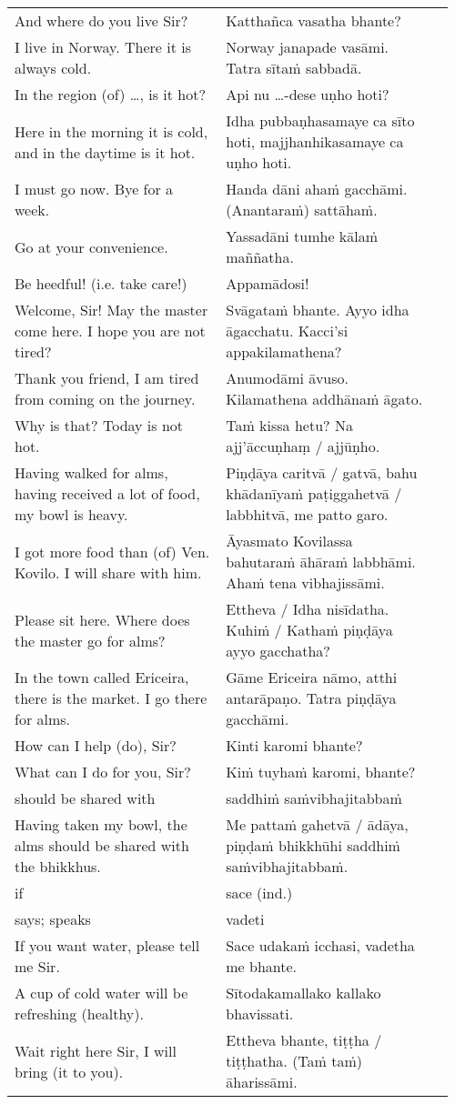 \documentclass[a5paper]{memoir}
\begin{document}
\begin{longtable}{L{0.48\linewidth} L{0.48\linewidth} H}
And where do you live Sir? & Katthañca vasatha bhante? & \\[0pt]
I live in Norway. There it is always cold. & Norway janapade vasāmi. Tatra sītaṁ sabbadā. & \\[0pt]
In the region (of) \ldots{}, is it hot? & Api nu \ldots{}-dese uṇho hoti? & \\[0pt]
Here in the morning it is cold, and in the daytime is it hot. & Idha pubbaṇhasamaye ca sīto hoti, majjhanhikasamaye ca uṇho hoti. & \\[0pt]
I must go now. Bye for a week. & Handa dāni ahaṁ gacchāmi. (Anantaraṁ) sattāhaṁ. & \\[0pt]
Go at your convenience. & Yassadāni tumhe kālaṁ maññatha. & \\[0pt]
Be heedful! (i.e. take care!) & Appamādosi! & \\[0pt]
Welcome, Sir! May the master come here. I hope you are not tired? & Svāgataṁ bhante. Ayyo idha āgacchatu. Kacci'si appakilamathena? & \\[0pt]
Thank you friend, I am tired from coming on the journey. & Anumodāmi āvuso. Kilamathena addhānaṁ āgato. & \\[0pt]
Why is that? Today is not hot. & Taṁ kissa hetu? Na ajj'āccuṇhaṃ / ajjūṇho. & \\[0pt]
Having walked for alms, having received a lot of food, my bowl is heavy. & Piṇḍāya caritvā / gatvā, bahu khādanīyaṁ paṭiggahetvā / labbhitvā, me patto garo. & \\[0pt]
I got more food than (of) Ven. Kovilo. I will share with him. & Āyasmato Kovilassa bahutaraṁ āhāraṁ labbhāmi. Ahaṁ tena vibhajissāmi. & \\[0pt]
Please sit here. Where does the master go for alms? & Ettheva / Idha nisīdatha. Kuhiṁ / Kathaṁ piṇḍāya ayyo gacchatha? & \\[0pt]
In the town called Ericeira, there is the market. I go there for alms. & Gāme Ericeira nāmo, atthi antarāpaṇo. Tatra piṇḍāya gacchāmi. & \\[0pt]
How can I help (do), Sir? & Kinti karomi bhante? & \\[0pt]
What can I do for you, Sir? & Kiṁ tuyhaṁ karomi, bhante? & \\[0pt]
should be shared with & saddhiṁ saṁvibhajitabbaṁ & \\[0pt]
Having taken my bowl, the alms should be shared with the bhikkhus. & Me pattaṁ gahetvā / ādāya, piṇḍaṁ bhikkhūhi saddhiṁ saṁvibhajitabbaṁ. & \\[0pt]
if & sace (ind.) & \\[0pt]
says; speaks & vadeti & \\[0pt]
If you want water, please tell me Sir. & Sace udakaṁ icchasi, vadetha me bhante. & \\[0pt]
A cup of cold water will be refreshing (healthy). & Sītodakamallako kallako bhavissati. & \\[0pt]
Wait right here Sir, I will bring (it to you). & Ettheva bhante, tiṭṭha / tiṭṭhatha. (Taṁ taṁ) āharissāmi. & \\[0pt]
\end{longtable}
\end{document}
